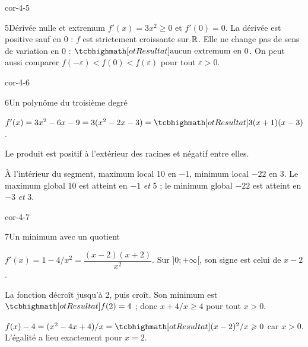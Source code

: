 \begin{blocLivre}{cor-4-5}
\begin{corrige}{5}{Dérivée nulle et extremum}
$f'(x)=3x^2\geq0$ et $f'(0)=0$. La dérivée est positive sauf en 0 :
$f$ est strictement croissante sur $\mathbb{R}$. Elle ne change pas de sens de variation
en 0 : $\res{\text{aucun extremum en }0}$.
On peut aussi comparer $f(-\varepsilon)<f(0)<f(\varepsilon)$ pour tout $\varepsilon>0$.
\label{figlivre-r04-05-var-cor}

\end{corrige}
\end{blocLivre}
\begin{blocLivre}{cor-4-6}
\begin{corrige}{6}{Un polynôme du troisième degré}
\begin{questions}
\item $f'(x)=3x^2-6x-9=3(x^2-2x-3)=\res{3(x+1)(x-3)}$.
\item Le produit est positif à l'extérieur des racines et négatif entre elles.
\end{questions}
\begin{center}\begin{tableau}
\end{tableau}\end{center}
\enspace À l'intérieur du segment, maximum local 10 en $-1$,
minimum local $-22$ en 3. Le maximum global 10 est atteint en $-1$ \emph{et} 5 ;
le minimum global $-22$ est atteint en $-3$ \emph{et} 3.
\end{corrige}
\end{blocLivre}
\begin{blocLivre}{cor-4-7}
\begin{corrige}{7}{Un minimum avec un quotient}
\begin{questions}
\item $f'(x)=1-4/x^2=\dfrac{(x-2)(x+2)}{x^2}$.
Sur $]0;+\infty[$, son signe est celui de $x-2$.
\item La fonction décroît jusqu'à 2, puis croît. Son minimum est
$\res{f(2)=4}$ ; donc $x+4/x\geq4$ pour tout $x>0$.
\item $f(x)-4=(x^2-4x+4)/x=\res{(x-2)^2/x}\geq0$ car $x>0$.
L'égalité a lieu exactement pour $x=2$.
\end{questions}
\label{figlivre-r04-07-var-cor}

\end{corrige}
\end{blocLivre}
